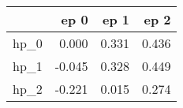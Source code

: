 \begin{tabular}{lrrr}
\toprule
{} &   ep 0 &   ep 1 &   ep 2 \\
\midrule
hp\_0 &  0.000 &  0.331 &  0.436 \\
hp\_1 & -0.045 &  0.328 &  0.449 \\
hp\_2 & -0.221 &  0.015 &  0.274 \\
\bottomrule
\end{tabular}
